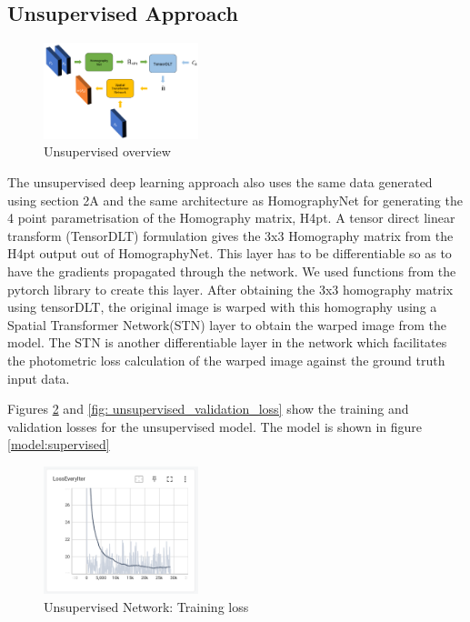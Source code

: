 \documentclass[conference]{IEEEtran}
\begin{document}
\subsection{Unsupervised Approach}

\begin{figure}[!htbp]
  \centering
  \includegraphics[width=0.4\textwidth]{phase1/Unsupervised.png}
  \caption{Unsupervised overview}
  \label{fig: Unsupervised overview}
\end{figure}


The unsupervised deep learning approach also uses the same data generated using section 2A and the same architecture as HomographyNet for generating the 4 point parametrisation of the Homography matrix, H4pt. A tensor direct linear transform (TensorDLT) formulation gives the 3x3 Homography matrix from the H4pt output out of HomographyNet. This layer has to be differentiable so as to have the gradients propagated through the network. We used functions from the pytorch library to create this layer. After obtaining the 3x3 homography matrix using tensorDLT, the original image is warped with this homography using a Spatial Transformer Network(STN) layer to obtain the warped image from the model. The STN is another differentiable layer in the network which facilitates the photometric loss calculation of the warped image against the ground truth input data.

Figures \ref{fig: unsupervised_training_loss} and \ref{fig: unsupervised_validation_loss} show the training and validation losses for the unsupervised model. The model is shown in figure \ref{model:supervised}

\begin{figure}[!htbp]
  \centering
  \includegraphics[width=0.4\textwidth]{phase1/unsup_training_loss.png}
  \caption{Unsupervised Network: Training loss}
  \label{fig: unsupervised_training_loss}
\end{figure}
\end{document}
